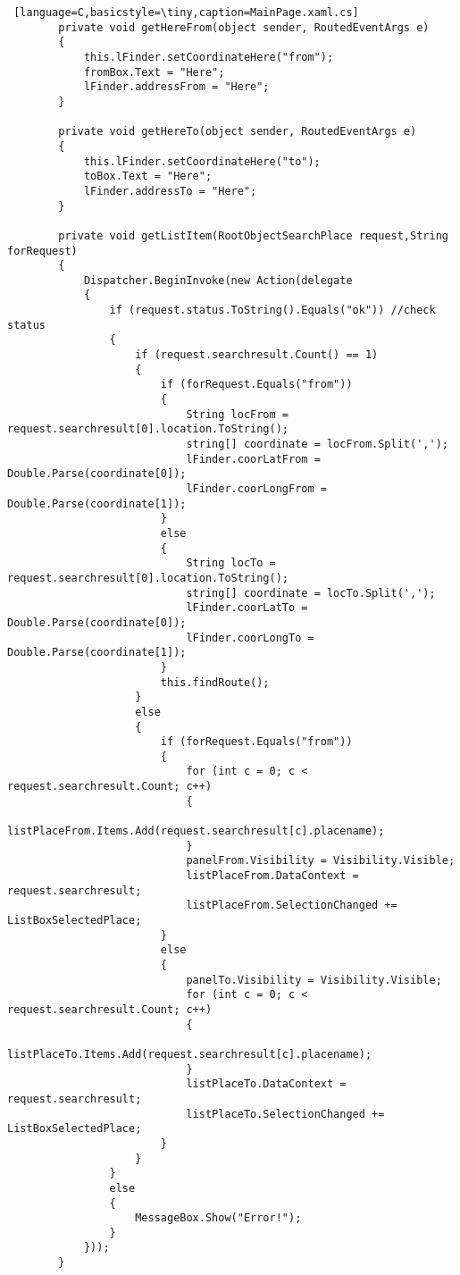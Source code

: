 \begin{lstlisting} [language=C,basicstyle=\tiny,caption=MainPage.xaml.cs]
        private void getHereFrom(object sender, RoutedEventArgs e)
        {
            this.lFinder.setCoordinateHere("from");
            fromBox.Text = "Here";
            lFinder.addressFrom = "Here";
        }

        private void getHereTo(object sender, RoutedEventArgs e)
        {
            this.lFinder.setCoordinateHere("to");
            toBox.Text = "Here";
            lFinder.addressTo = "Here";
        }

        private void getListItem(RootObjectSearchPlace request,String forRequest)
        {
            Dispatcher.BeginInvoke(new Action(delegate
            {
                if (request.status.ToString().Equals("ok")) //check status
                {
                    if (request.searchresult.Count() == 1)
                    {
                        if (forRequest.Equals("from"))
                        {
                            String locFrom = request.searchresult[0].location.ToString();
                            string[] coordinate = locFrom.Split(',');
                            lFinder.coorLatFrom = Double.Parse(coordinate[0]);
                            lFinder.coorLongFrom = Double.Parse(coordinate[1]);
                        }
                        else
                        {
                            String locTo = request.searchresult[0].location.ToString();
                            string[] coordinate = locTo.Split(',');
                            lFinder.coorLatTo = Double.Parse(coordinate[0]);
                            lFinder.coorLongTo = Double.Parse(coordinate[1]);
                        }
                        this.findRoute();
                    }
                    else
                    {
                        if (forRequest.Equals("from"))
                        {
                            for (int c = 0; c < request.searchresult.Count; c++)
                            {
                                listPlaceFrom.Items.Add(request.searchresult[c].placename);
                            }
                            panelFrom.Visibility = Visibility.Visible;
                            listPlaceFrom.DataContext = request.searchresult;
                            listPlaceFrom.SelectionChanged += ListBoxSelectedPlace;
                        }
                        else
                        {
                            panelTo.Visibility = Visibility.Visible;
                            for (int c = 0; c < request.searchresult.Count; c++)
                            {
                                listPlaceTo.Items.Add(request.searchresult[c].placename);
                            }
                            listPlaceTo.DataContext = request.searchresult;
                            listPlaceTo.SelectionChanged += ListBoxSelectedPlace;
                        }
                    }
                }
                else
                {
                    MessageBox.Show("Error!");
                }
            }));
        }


\end{lstlisting}
